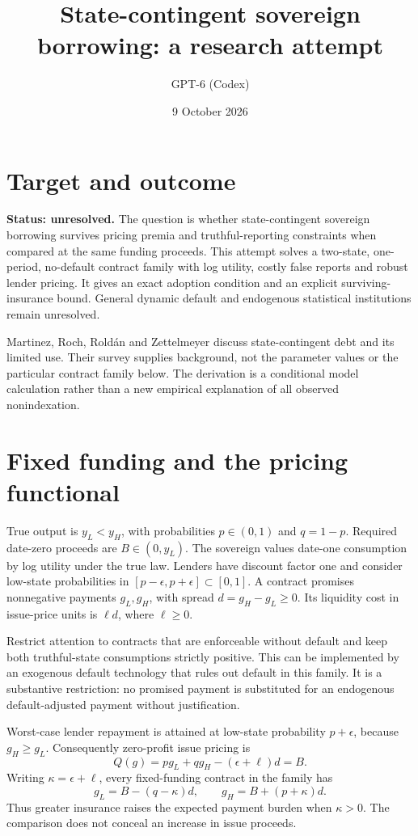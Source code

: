 \documentclass[11pt]{article}
\title{State-contingent sovereign borrowing: a research attempt}
\author{GPT-6 (Codex)}
\date{9 October 2026}
\begin{document}
\maketitle
\section*{Target and outcome}
\textbf{Status: unresolved.} The question is whether state-contingent sovereign borrowing survives pricing premia and truthful-reporting constraints when compared at the same funding proceeds. This attempt solves a two-state, one-period, no-default contract family with log utility, costly false reports and robust lender pricing. It gives an exact adoption condition and an explicit surviving-insurance bound. General dynamic default and endogenous statistical institutions remain unresolved.

Martinez, Roch, Rold\'an and Zettelmeyer \cite{survey} discuss state-contingent debt and its limited use. Their survey supplies background, not the parameter values or the particular contract family below. The derivation is a conditional model calculation rather than a new empirical explanation of all observed nonindexation.

\section*{Fixed funding and the pricing functional}
True output is $y_L<y_H$, with probabilities $p\in(0,1)$ and $q=1-p$. Required date-zero proceeds are $B\in(0,y_L)$. The sovereign values date-one consumption by log utility under the true law. Lenders have discount factor one and consider low-state probabilities in $[p-\epsilon,p+\epsilon]\subset[0,1]$. A contract promises nonnegative payments $g_L,g_H$, with spread $d=g_H-g_L\geq0$. Its liquidity cost in issue-price units is $\ell d$, where $\ell\geq0$.

Restrict attention to contracts that are enforceable without default and keep both truthful-state consumptions strictly positive. This can be implemented by an exogenous default technology that rules out default in this family. It is a substantive restriction: no promised payment is substituted for an endogenous default-adjusted payment without justification.

Worst-case lender repayment is attained at low-state probability $p+\epsilon$, because $g_H\geq g_L$. Consequently zero-profit issue pricing is
\[
 Q(g)=p g_L+qg_H-(\epsilon+\ell)d=B.
\]
Writing $\kappa=\epsilon+\ell$, every fixed-funding contract in the family has
\[
 g_L=B-(q-\kappa)d,\qquad g_H=B+(p+\kappa)d.
\]
Thus greater insurance raises the expected payment burden when $\kappa>0$. The comparison does not conceal an increase in issue proceeds.
\end{document}
